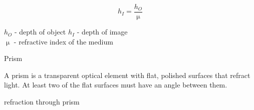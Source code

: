 \documentclass[12 pt]{book}
\newcommand*\Times{\fontfamily{ptm}\selectfont}
\newenvironment{my-title}
{
	\begin{center}
	\begin{itshape}
	\large\Times\textit{}
}
{
	\end{itshape}
	\end{center}
}
\newenvironment{definition}
{
	\begin{center}
	\begin{itshape}
	\normalsize\Times\textit{}
}
{
	\end{itshape}
	\end{center}
}
\newenvironment{note}
{
	\begin{center}
	\begin{itshape}
	\normalsize\Times\textit{}
}
{
	\end{itshape}
	\end{center}
}
\begin{document}
\[
h_I =  \dfrac{h_O}{\upmu}
\]

\begin{note}
$h_O$ - depth of object \quad $h_I$ - depth of image\\
$\upmu$ - refractive index of the medium
\end{note}

\pagebreak



\begin{my-title}
Prism
\end{my-title}

\begin{definition}
A prism is a transparent optical element with flat, polished surfaces that refract light. At least two of the flat surfaces must have an angle between them.
\end{definition}

\begin{center}
\end{center}



\pagebreak





\begin{my-title}
refraction through prism
\end{my-title}
\end{document}

